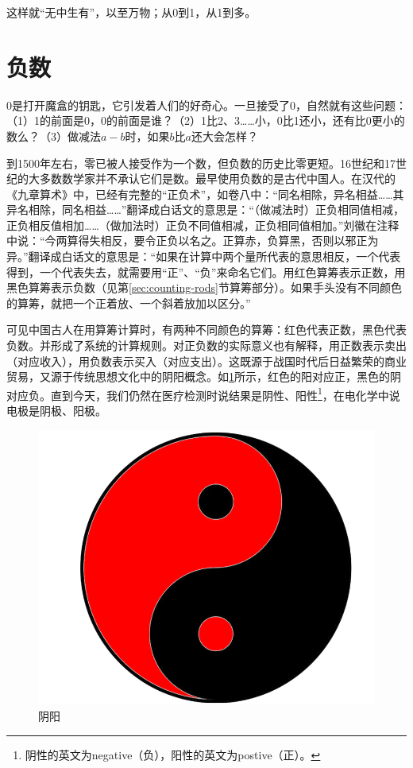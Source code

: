 \documentclass[b5paper]{ctexart}
\begin{document}
这样就“无中生有”，以至万物；从0到1，从1到多。

\section{负数}

0是打开魔盒的钥匙，它引发着人们的好奇心。一旦接受了0，自然就有这些问题：（1）1的前面是0，0的前面是谁？（2）1比2、3……小，0比1还小，还有比0更小的数么？（3）做减法$a -b$时，如果$b$比$a$还大会怎样？

  
到1500年左右，零已被人接受作为一个数，但负数的历史比零更短。16世纪和17世纪的大多数数学家并不承认它们是数。最早使用负数的是古代中国人。在汉代的《九章算术》中，已经有完整的“正负术”，如卷八中：“同名相除，异名相益……其异名相除，同名相益……”翻译成白话文的意思是：“（做减法时）正负相同值相减，正负相反值相加……（做加法时）正负不同值相减，正负相同值相加。”刘徽在注释中说：“今两算得失相反，要令正负以名之。正算赤，负算黑，否则以邪正为异。”翻译成白话文的意思是：“如果在计算中两个量所代表的意思相反，一个代表得到，一个代表失去，就需要用“正”、“负”来命名它们。用红色算筹表示正数，用黑色算筹表示负数（见第\ref{sec:counting-rods}节算筹部分）。如果手头没有不同颜色的算筹，就把一个正着放、一个斜着放加以区分。”\cite{Jiuzhang-2009}

可见中国古人在用算筹计算时，有两种不同颜色的算筹：红色代表正数，黑色代表负数。并形成了系统的计算规则。对正负数的实际意义也有解释，用正数表示卖出（对应收入），用负数表示买入（对应支出）。这既源于战国时代后日益繁荣的商业贸易，又源于传统思想文化中的阴阳概念。如\cref{fig:yinyang}所示，红色的阳对应正，黑色的阴对应负。直到今天，我们仍然在医疗检测时说结果是阴性、阳性\footnote{阴性的英文为negative（负），阳性的英文为postive（正）。}，在电化学中说电极是阴极、阳极。

\begin{figure}[htbp]
 \centering
 \includegraphics[scale=0.1]{img/yinyang}
 \caption{阴阳}
 \label{fig:yinyang}
\end{figure}
\end{document}
